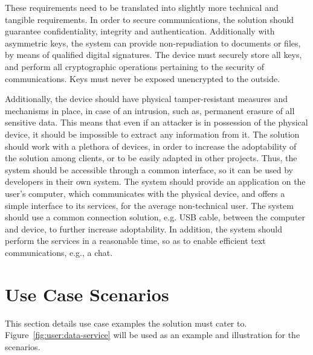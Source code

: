 These requirements need to be translated into slightly more technical and tangible requirements. In order to secure communications, the solution should guarantee confidentiality, integrity and authentication.
Additionally with asymmetric keys, the system can provide non-repudiation to documents or files, by means of qualified digital signatures.
The device must securely store all keys, and perform all cryptographic operations pertaining to the security of communications. Keys must never be exposed unencrypted to the outside.

Additionally, the device should have physical tamper-resistant measures and mechanisms in place, in case of an intrusion, such as, permanent erasure of all sensitive data. 
This means that even if an attacker is in possession of the physical device, it should be impossible to extract any information from it.
The solution should work with a plethora of devices, in order to increase the adoptability of the solution among clients, or to be easily adapted in other projects. Thus, the system should be accessible through a common interface, so it can be used by developers in their own system.
The system should provide an application on the user's computer, which communicates with the physical device, and offers a simple interface to its services, for the average non-technical user.
The system should use a common connection solution, e.g. USB cable, between the computer and device, to further increase adoptability.
In addition, the system should perform the services in a reasonable time, so as to enable efficient text communications, e.g., a chat.


\section{Use Case Scenarios}\label{chap:problem:scenarios}

This section details use case examples the solution must cater to. Figure~\ref{fig:user:data-service} will be used as an example and illustration for the scenarios.

